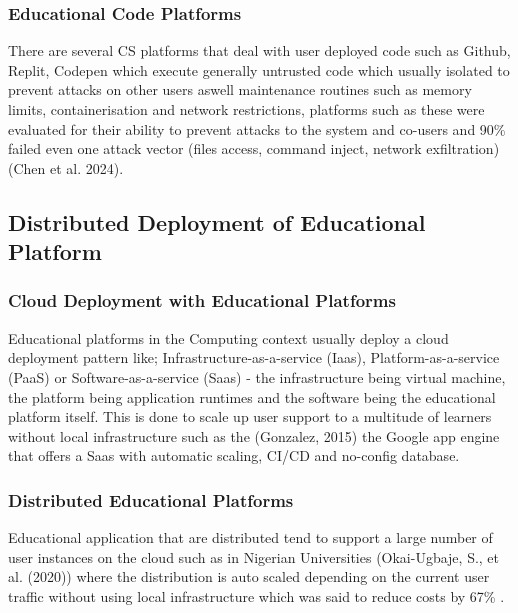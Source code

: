 \documentclass{article}
\begin{document}
\subsubsection{Educational Code Platforms}
There are several CS platforms that deal with user deployed code such as Github, Replit, Codepen which execute generally untrusted code which usually isolated to prevent attacks on other users aswell maintenance routines such as memory limits, containerisation and network restrictions, platforms such as these were evaluated for their ability to prevent attacks to the system and co-users and 90\% failed even one attack vector (files access, command inject, network exfiltration) (Chen et al. 2024). 
\subsection{Distributed Deployment of Educational Platform} %
\subsubsection{Cloud Deployment with Educational Platforms}
Educational platforms in the Computing context usually deploy a cloud deployment pattern like; Infrastructure-as-a-service (Iaas), Platform-as-a-service (PaaS) or Software-as-a-service (Saas) - the infrastructure being virtual machine, the platform being application runtimes and the software being the educational platform itself. This is done to scale up user support to a multitude of learners without local infrastructure  such as the (Gonzalez, 2015) the Google app engine that offers a Saas with automatic scaling, CI/CD and no-config database.
\subsubsection{Distributed Educational Platforms}
Educational application that are distributed tend to support a large number of user instances on the cloud such as in Nigerian Universities (Okai-Ugbaje, S., et al. (2020)) where the distribution is auto scaled depending on the current user traffic without using local infrastructure which was said to reduce costs by 67\% .
\end{document}
